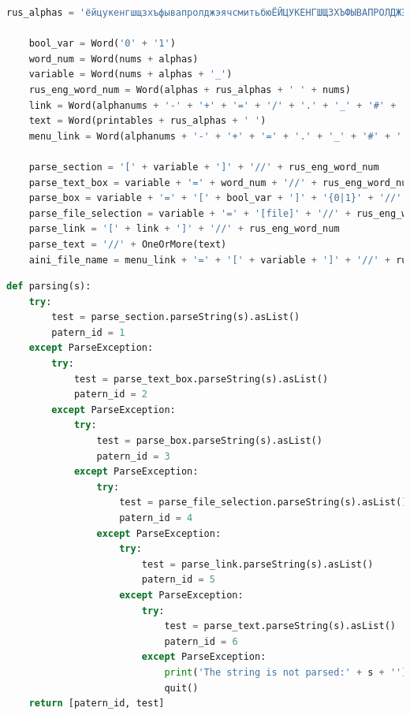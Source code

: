 \begin{lstlisting}[frame=single, label={rndhpcgui.2023.05.04.parser}, caption={Парсер}, language={Python}] 
    rus_alphas = 'ёйцукенгшщзхъфывапролджэячсмитьбюЁЙЦУКЕНГШЩЗХЪФЫВАПРОЛДЖЭЯЧСМИТЬБЮ'

    bool_var = Word('0' + '1')
    word_num = Word(nums + alphas)
    variable = Word(nums + alphas + '_')
    rus_eng_word_num = Word(alphas + rus_alphas + ' ' + nums)
    link = Word(alphanums + '-' + '+' + '=' + '/' + '.' + '_' + '#' + ':' + '&' + '?' + '%')
    text = Word(printables + rus_alphas + ' ')
    menu_link = Word(alphanums + '-' + '+' + '=' + '.' + '_' + '#' + ':' + '&' + '?' + '%')
    
    parse_section = '[' + variable + ']' + '//' + rus_eng_word_num
    parse_text_box = variable + '=' + word_num + '//' + rus_eng_word_num
    parse_box = variable + '=' + '[' + bool_var + ']' + '{0|1}' + '//' + rus_eng_word_num
    parse_file_selection = variable + '=' + '[file]' + '//' + rus_eng_word_num
    parse_link = '[' + link + ']' + '//' + rus_eng_word_num
    parse_text = '//' + OneOrMore(text)
    aini_file_name = menu_link + '=' + '[' + variable + ']' + '//' + rus_eng_word_num
\end{lstlisting}

\begin{lstlisting}[frame=single, label={rndhpcgui.2023.05.04.parsing}, caption={Функция parsing}, language={Python}] 
    def parsing(s):
    try:
        test = parse_section.parseString(s).asList()
        patern_id = 1
    except ParseException:
        try:
            test = parse_text_box.parseString(s).asList()
            patern_id = 2
        except ParseException:
            try:
                test = parse_box.parseString(s).asList()
                patern_id = 3
            except ParseException:
                try:
                    test = parse_file_selection.parseString(s).asList()
                    patern_id = 4
                except ParseException:
                    try:
                        test = parse_link.parseString(s).asList()
                        patern_id = 5
                    except ParseException:
                        try:
                            test = parse_text.parseString(s).asList()
                            patern_id = 6
                        except ParseException:
                            print('The string is not parsed:' + s + '')
                            quit()
    return [patern_id, test]
\end{lstlisting}


